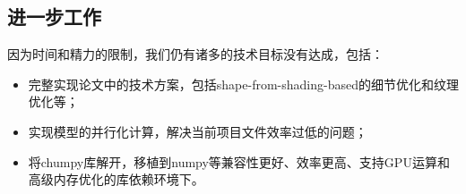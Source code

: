 \documentclass{article}
\begin{document}
\subsection{进一步工作}
因为时间和精力的限制，我们仍有诸多的技术目标没有达成，包括：

\begin{itemize}
	\item 完整实现论文\cite{paper2}中的技术方案，包括shape-from-shading-based的细节优化和纹理优化等；
	\item 实现模型的并行化计算，解决当前项目文件效率过低的问题；
	\item 将chumpy库解开，移植到numpy等兼容性更好、效率更高、支持GPU运算和高级内存优化的库依赖环境下。
\end{itemize}

\newpage



\clearpage
\end{document}
